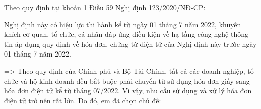  Theo quy định tại khoản 1 Điều 59 Nghị định 123/2020/NĐ-CP:

Nghị định này có hiệu lực thi hành kể từ ngày 01 tháng 7 năm 2022, khuyến khích cơ quan, tổ chức, cá nhân đáp ứng điều kiện về hạ tầng công nghệ thông tin áp dụng quy định về hóa đơn, chứng từ điện tử của Nghị định này trước ngày 01 tháng 7 năm 2022.

=> Theo quy định của Chính phủ và Bộ Tài Chính, tất cả các doanh nghiệp, tổ chức và hộ kinh doanh đều bắt buộc phải chuyển từ sử dụng hóa đơn giấy sang hóa đơn điện tử kể từ tháng 07/2022. Vì vậy, nhu cầu sử dụng và xử lý hóa đơn điện tử trở nên rất lớn. Do đó, em đã chọn chủ đề:

